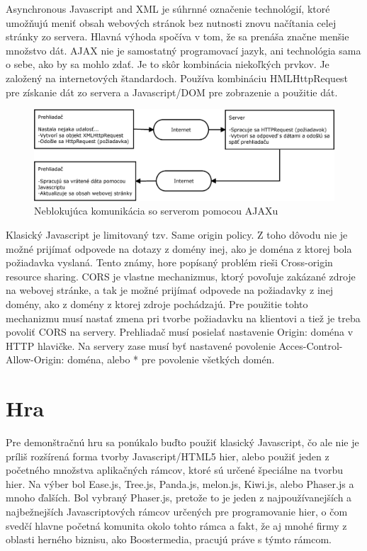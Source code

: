 Asynchronous Javascript and XML je súhrnné označenie technológií, ktoré umožňujú meniť obsah webových stránok bez nutnosti znovu načítania celej stránky zo servera. Hlavná výhoda spočíva v tom, že sa prenáša značne menšie množstvo dát. AJAX nie je samostatný programovací jazyk, ani technológia sama o sebe, ako by sa mohlo zdať. Je to skôr kombinácia niekoľkých prvkov. Je založený na internetových štandardoch. Používa kombináciu HMLHttpRequest pre získanie dát zo servera a Javascript/DOM pre zobrazenie a použitie dát. \cite{w3-ajax}
\begin{figure}[h]
  \centering
  \includegraphics[scale=0.40]{fig/ajax.eps}
  \caption{Neblokujúca komunikácia so serverom pomocou AJAXu}
  \label{fig:ajax}
\end{figure}

Klasický Javascript je limitovaný tzv. Same origin policy. Z toho dôvodu nie je možné prijímať odpovede na dotazy z domény inej, ako je doména z ktorej bola požiadavka vyslaná. Tento známy, hore popísaný problém rieši Cross-origin resource sharing. CORS je vlastne mechanizmus, ktorý povoľuje zakázané zdroje na webovej stránke, a tak je možné prijímať odpovede na požiadavky z inej domény, ako z domény z ktorej zdroje pochádzajú. Pre použitie tohto mechanizmu musí nastať zmena pri tvorbe požiadavku na klientovi a tiež je treba povoliť CORS na servery. Prehliadač musí posielať nastavenie Origin: doména v HTTP hlavičke. Na servery zase musí byť nastavené povolenie Acces-Control-Allow-Origin: doména, alebo * pre povolenie všetkých domén. \cite{cors}

\section{Hra}
\label{sec:hra}
Pre demonštračnú hru sa ponúkalo buďto použiť klasický Javascript, čo ale nie je príliš rozšírená forma tvorby Javascript/HTML5 hier, alebo použiť jeden z početného množstva aplikačných rámcov, ktoré sú určené špeciálne na tvorbu hier. Na výber bol Ease.js, Tree.js, Panda.js, melon.js, Kiwi.js, alebo Phaser.js a mnoho ďalších. Bol vybraný Phaser.js, pretože to je jeden z najpoužívanejších a najbežnejších Javascriptových rámcov určených pre programovanie hier, o čom svedčí hlavne početná komunita okolo tohto rámca a fakt, že aj mnohé firmy z oblasti herného biznisu, ako Boostermedia, pracujú práve s týmto rámcom. 

